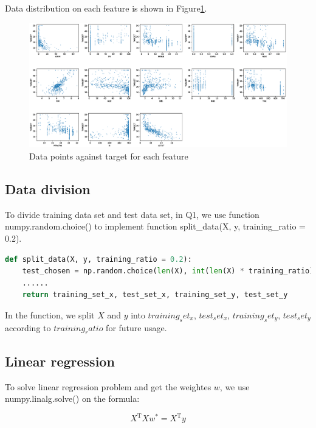 \documentclass[a4paper]{article}
\begin{document}
Data distribution on each feature is shown in Figure\ref{fig: Data distribution}.

\begin{figure}[htbp]
\centering
\includegraphics[width = 15cm]{DataDistribution}
\caption{Data points against target for each feature}
\label{fig: Data distribution}
\end{figure}

\subsection{Data division}

To divide training data set and test data set, in Q1, we use function numpy.random.choice() to implement function split\_data(X, y, training\_ratio = 0.2).

\begin{lstlisting}[language = Python]
def split_data(X, y, training_ratio = 0.2):
    test_chosen = np.random.choice(len(X), int(len(X) * training_ratio))
    ......
    return training_set_x, test_set_x, training_set_y, test_set_y
\end{lstlisting}

In the function, we split $X$ and $y$ into $training_set_x$, $test_set_x$, $training_set_y$, $test_set_y$ according to $training_ratio$ for future usage.

\subsection{Linear regression}

To solve linear regression problem and get the weightes $w$, we use numpy.linalg.solve() on the formula:

\begin{equation}
    X^\mathrm{T}Xw^*=X^\mathrm{T}y
\end{equation}
\end{document}
